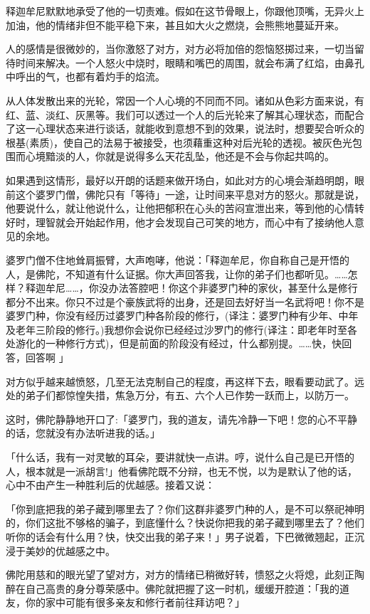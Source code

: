 \documentclass[12pt,twoside,openany]{book}
\begin{document}
释迦牟尼默默地承受了他的一切责难。假如在这节骨眼上，你跟他顶嘴，无异火上加油，他的情绪非但不能平稳下来，甚且如大火之燃烧，会熊熊地蔓延开来。

人的感情是很微妙的，当你激怒了对方，对方必将加倍的怨恼怒掷过来，一切当留待时间来解决。一个人怒火中烧时，眼睛和嘴巴的周围，就会布满了红焰，由鼻孔中呼出的气，也都有着灼手的焰流。

从人体发散出来的光轮，常因一个人心境的不同而不同。诸如从色彩方面来说，有红、蓝、淡红、灰黑等。我们可以透过一个人的后光轮来了解其心理状态，而配合了这一心理状态来进行谈话，就能收到意想不到的效果，说法时，想要契合听众的根基(素质)，使自己的法易于被接受，也须藉重这种对后光轮的透视。被灰色光包围而心境黯淡的人，你就是说得多么天花乱坠，他还是不会与你起共鸣的。

如果遇到这情形，最好以开朗的话题来做开场白，如此对方的心境会渐趋明朗，眼前这个婆罗门僧，佛陀只有「等待」一途，让时间来平息对方的怒火。那就是说，他要说什么，就让他说什么，让他把郁积在心头的苦闷宣泄出来，等到他的心情转好时，理智就会开始起作用，他才会发现自己可笑的地方，而心中有了接纳他人意见的余地。

婆罗门僧不住地耸肩振臂，大声咆哮，他说：「释迦牟尼，你自称自己是开悟的人，是佛陀，不知道有什么证据。你大声回答我，让你的弟子们也都听见。……怎样？释迦牟尼……，你没办法答腔吧！你这个非婆罗门种的家伙，甚至什么是修行都分不出来。你只不过是个豪族武将的出身，还是回去好好当一名武将吧！你不是婆罗门种，你没有经历过婆罗门种各阶段的修行，(译注：婆罗门种有少年、中年及老年三阶段的修行。)我想你会说你已经经过沙罗门的修行(译注：即老年时至各处游化的一种修行方式)，但是前面的阶段没有经过，什么都别提。……快，快回答，回答啊	」

对方似乎越来越愤怒，几至无法克制自己的程度，再这样下去，眼看要动武了。远处的弟子们都惊惶失措，焦急万分，有五、六个人已作势一跃而上，以防万一。

这时，佛陀静静地开口了:「婆罗门，我的道友，请先冷静一下吧！您的心不平静的话，您就没有办法听进我的话。」

「什么话，我有一对灵敏的耳朵，要讲就快一点讲。哼，说什么自己是已开悟的人，根本就是一派胡言!」他看佛陀既不分辩，也无不悦，以为是默认了他的话，心中不由产生一种胜利后的优越感。接着又说：

「你到底把我的弟子藏到哪里去了？你们这群非婆罗门种的人，是不可以祭祀神明的，你们这批不够格的骗子，到底懂什么？快说你把我的弟子藏到哪里去了？他们听你的话会有什么用？快，快交出我的弟子来！」男子说着，下巴微微翘起，正沉浸于美妙的优越感之中。

佛陀用慈和的眼光望了望对方，对方的情绪已稍微好转，愦怒之火将熄，此刻正陶醉在自己高贵的身分尊荣感中。佛陀就把握了这一时机，缓缓开腔道：「我的道友，你的家中可能有很多亲友和修行者前往拜访吧？」
\end{document}
